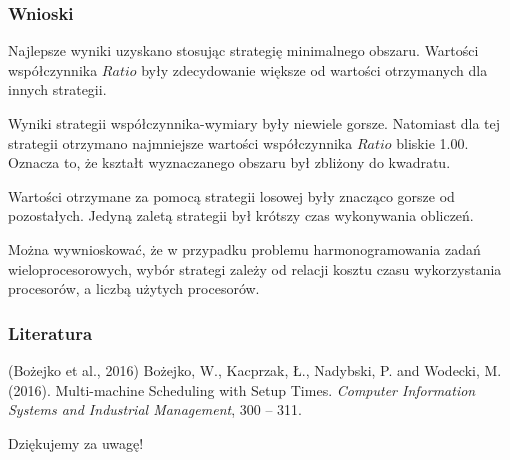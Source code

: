 \documentclass{beamer}
\begin{document}
\begin{frame}
    \frametitle{Wnioski}
    \begin{outline}
        \1 Najlepsze wyniki uzyskano stosując strategię minimalnego obszaru.
        Wartości współczynnika $\textit{Ratio}$ były zdecydowanie większe od wartości otrzymanych
        dla innych strategii.
        
        \1 Wyniki strategii współczynnika-wymiary były niewiele gorsze. Natomiast dla tej
        strategii otrzymano najmniejsze wartości współczynnika $\textit{Ratio}$ bliskie 1.00.
        Oznacza to, że kształt wyznaczanego obszaru był zbliżony do kwadratu. 
        
        \1 Wartości otrzymane za pomocą strategii losowej były znacząco gorsze od pozostałych.
        Jedyną zaletą strategii był krótszy czas wykonywania obliczeń.
        
        \1 Można wywnioskować, że w przypadku problemu harmonogramowania zadań wieloprocesorowych,
        wybór strategi zależy od relacji kosztu czasu wykorzystania procesorów, a liczbą użytych
        procesorów.
    \end{outline}
\end{frame}

\begin{frame}
\frametitle{Literatura}
\footnotesize{
\begin{thebibliography}{99} %
 (Bożejko et al., 2016)
\newblock Bożejko, W., Kacprzak, Ł., Nadybski, P. and Wodecki, M. (2016). Multi-machine Scheduling with Setup Times.
\newblock \emph{Computer Information Systems and Industrial Management}, 300 -- 311.
\end{thebibliography}
}
\end{frame}


\begin{frame}
\Huge{\centerline{Dziękujemy za uwagę!}}
\end{frame}

\end{document}
